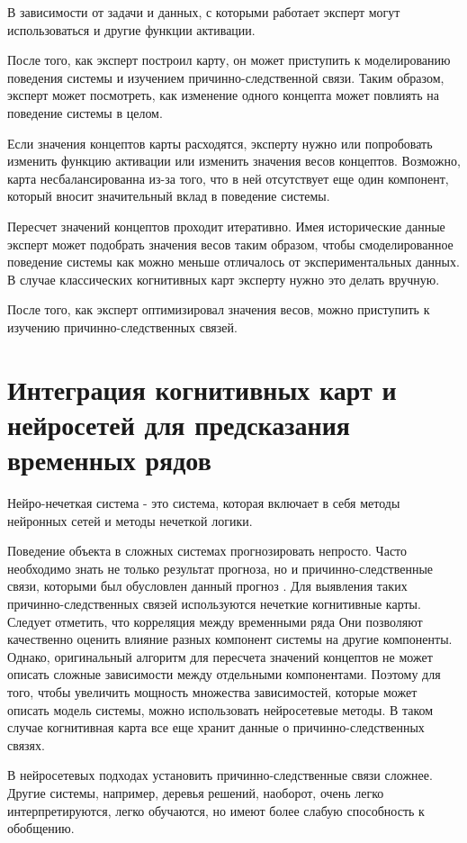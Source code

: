 В зависимости от задачи и данных, с которыми работает эксперт могут использоваться и другие
функции активации.

После того, как эксперт построил карту, он может приступить к моделированию поведения
системы и изучением причинно-следственной связи. Таким образом, эксперт может посмотреть,
как изменение одного концепта может повлиять на поведение системы в целом.

Если значения концептов карты расходятся, эксперту нужно или попробовать изменить функцию
активации или изменить значения весов концептов. Возможно, карта несбалансированна из-за
того, что в ней отсутствует еще один компонент, который вносит значительный вклад в поведение системы.

Пересчет значений концептов проходит итеративно. Имея исторические данные эксперт может
подобрать значения весов таким образом, чтобы смоделированное поведение системы как можно меньше отличалось
от экспериментальных данных. В случае классических когнитивных карт эксперту нужно это делать вручную.

После того, как эксперт оптимизировал значения весов, можно приступить к изучению причинно-следственных
связей.

\section{Интеграция когнитивных карт и нейросетей для предсказания временных рядов}

Нейро-нечеткая система - это система, которая включает в себя методы нейронных сетей и методы нечеткой логики.

Поведение объекта в сложных системах прогнозировать непросто.
Часто необходимо знать не только результат прогноза,
но и причинно-следственные связи, которыми был обусловлен данный прогноз
\cite{osoba2019dags} \cite{efficient_fcms}.
Для выявления таких причинно-следственных связей используются нечеткие когнитивные карты.
Следует отметить, что корреляция между временными ряда
Они позволяют качественно оценить влияние разных компонент системы на другие компоненты.
Однако, оригинальный алгоритм для пересчета значений концептов
не может описать сложные зависимости между отдельными компонентами.
Поэтому для того, чтобы увеличить мощность множества зависимостей, которые
может описать модель системы, можно использовать нейросетевые методы.
В таком случае когнитивная карта все еще хранит данные о причинно-следственных связях.

В нейросетевых подходах установить причинно-следственные связи сложнее.
Другие системы, например, деревья решений, наоборот, очень легко интерпретируются, легко обучаются,
но имеют более слабую способность к обобщению.

